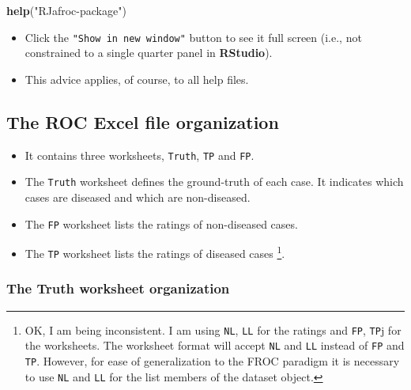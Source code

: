 \documentclass[]{book}
\newenvironment{Shaded}{\begin{snugshade}}{\end{snugshade}}
\newcommand{\KeywordTok}[1]{\textcolor[rgb]{0.13,0.29,0.53}{\textbf{#1}}}
\newcommand{\NormalTok}[1]{#1}
\newcommand{\StringTok}[1]{\textcolor[rgb]{0.31,0.60,0.02}{#1}}
\providecommand{\tightlist}{%
  \setlength{\itemsep}{0pt}\setlength{\parskip}{0pt}}
\let\rmarkdownfootnote\footnote%
\def\footnote{\protect\rmarkdownfootnote}
\begin{document}
\begin{Shaded}
\begin{Highlighting}[]
\KeywordTok{help}\NormalTok{(}\StringTok{"RJafroc-package"}\NormalTok{)}
\end{Highlighting}
\end{Shaded}

\begin{itemize}
\tightlist
\item
  Click the \texttt{"Show\ in\ new\ window"} button to see it full screen (i.e., not constrained to a single quarter panel in \textbf{RStudio}).
\item
  This advice applies, of course, to all help files.
\end{itemize}

\hypertarget{the-roc-excel-file-organization}{%
\subsection{The ROC Excel file organization}\label{the-roc-excel-file-organization}}

\begin{itemize}
\tightlist
\item
  It contains three worksheets, \texttt{Truth}, \texttt{TP} and \texttt{FP}.
\item
  The \texttt{Truth} worksheet defines the ground-truth of each case. It indicates which cases are diseased and which are non-diseased.
\item
  The \texttt{FP} worksheet lists the ratings of non-diseased cases.
\item
  The \texttt{TP} worksheet lists the ratings of diseased cases \footnote{OK, I am being inconsistent. I am using \texttt{NL}, \texttt{LL} for the ratings and \texttt{FP}, \texttt{TP}j for the worksheets. The worksheet format will accept \texttt{NL} and \texttt{LL} instead of \texttt{FP} and \texttt{TP}. However, for ease of generalization to the FROC paradigm it is necessary to use \texttt{NL} and \texttt{LL} for the list members of the dataset object.}.
\end{itemize}

\hypertarget{the-truth-worksheet-organization}{%
\subsubsection{The Truth worksheet organization}\label{the-truth-worksheet-organization}}
\end{document}
